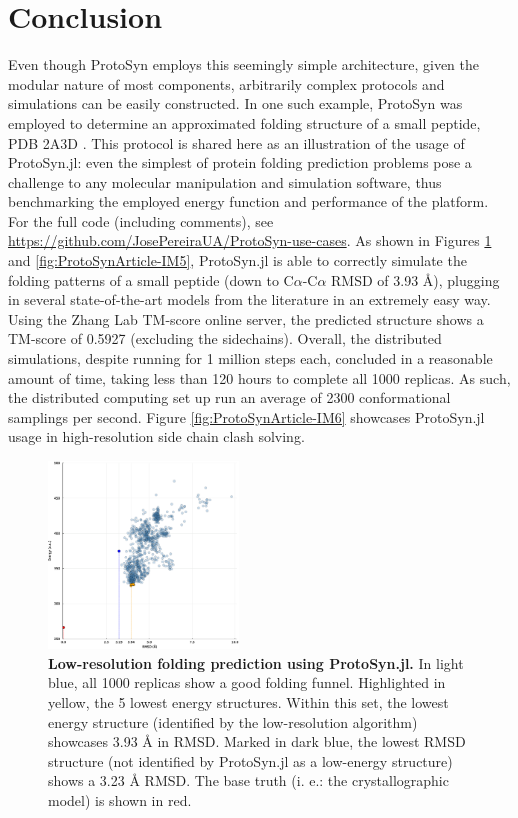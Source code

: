 \documentclass{juliacon}
\begin{document}
\section{Conclusion}

Even though ProtoSyn employs this seemingly simple architecture, given the modular nature of most components, arbitrarily complex protocols and simulations can be easily constructed. In one such example, ProtoSyn was employed to determine an approximated folding structure of a small peptide, PDB 2A3D \cite{Walsh1999}. This protocol is shared here as an illustration of the usage of ProtoSyn.jl: even the simplest of protein folding prediction problems pose a challenge to any molecular manipulation and simulation software, thus benchmarking the employed energy function and performance of the platform. For the full code (including comments), see \href{https://github.com/JosePereiraUA/ProtoSyn-use-cases}{https://github.com/JosePereiraUA/ProtoSyn-use-cases}. As shown in Figures \ref{fig:ProtoSynArticle-IM4} and \ref{fig:ProtoSynArticle-IM5}, ProtoSyn.jl is able to correctly simulate the folding patterns of a small peptide (down to C$\alpha$-C$\alpha$ RMSD of 3.93 \mbox{\normalfont\AA}), plugging in several state-of-the-art models from the literature in an extremely easy way. Using the Zhang Lab TM-score online server, the predicted structure shows a TM-score of 0.5927 (excluding the sidechains). Overall, the distributed simulations, despite running for 1 million steps each, concluded in a reasonable amount of time, taking less than 120 hours to complete all 1000 replicas. As such, the distributed computing set up run an average of 2300 conformational samplings per second. Figure \ref{fig:ProtoSynArticle-IM6} showcases ProtoSyn.jl usage in high-resolution side chain clash solving.\vspace{5mm}

\begin{figure}[h]
\centering
\includegraphics[width=0.45\textwidth]{ProtoSynArticle-IM4}
\caption{\textbf{Low-resolution folding prediction using ProtoSyn.jl.} In light blue, all 1000 replicas show a good folding funnel. Highlighted in yellow, the 5 lowest energy structures. Within this set, the lowest energy structure (identified by the low-resolution algorithm) showcases 3.93 Å in RMSD. Marked in dark blue, the lowest RMSD structure (not identified by ProtoSyn.jl as a low-energy structure) shows a 3.23 Å RMSD. The base truth (i. e.: the crystallographic model) is shown in red.}
\label{fig:ProtoSynArticle-IM4}
\end{figure}
\end{document}
